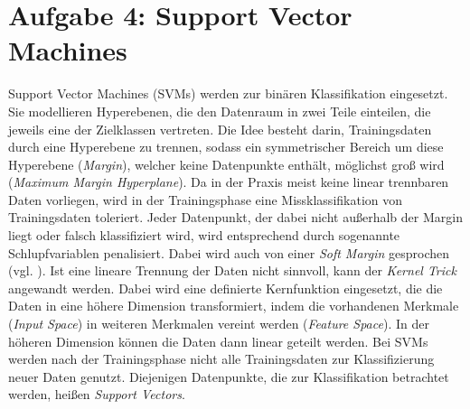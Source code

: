 \section{Aufgabe 4: Support Vector Machines}
Support Vector Machines (SVMs) werden zur binären Klassifikation eingesetzt. Sie modellieren Hyperebenen, die den Datenraum in zwei Teile einteilen, die jeweils eine der Zielklassen vertreten. Die Idee besteht darin, Trainingsdaten durch eine Hyperebene zu trennen, sodass ein symmetrischer Bereich um diese Hyperebene (\emph{Margin}), welcher keine Datenpunkte enthält, möglichst groß wird (\emph{Maximum Margin Hyperplane}). Da in der Praxis meist keine linear trennbaren Daten vorliegen, wird in der Trainingsphase eine Missklassifikation von Trainingsdaten toleriert. Jeder Datenpunkt, der dabei nicht außerhalb der Margin liegt oder falsch klassifiziert wird, wird entsprechend durch sogenannte Schlupfvariablen penalisiert. Dabei wird auch von einer \emph{Soft Margin} gesprochen (vgl. \cite{2015_aggarwal}). Ist eine lineare Trennung der Daten nicht sinnvoll, kann der \emph{Kernel Trick} angewandt werden. Dabei wird eine definierte Kernfunktion eingesetzt, die die Daten in eine höhere Dimension transformiert, indem die vorhandenen Merkmale (\emph{Input Space}) in weiteren Merkmalen vereint werden (\emph{Feature Space}). In der höheren Dimension können die Daten dann linear geteilt werden. Bei SVMs werden nach der Trainingsphase nicht alle Trainingsdaten zur Klassifizierung neuer Daten genutzt. Diejenigen Datenpunkte, die zur Klassifikation betrachtet werden, heißen \emph{Support Vectors}.
